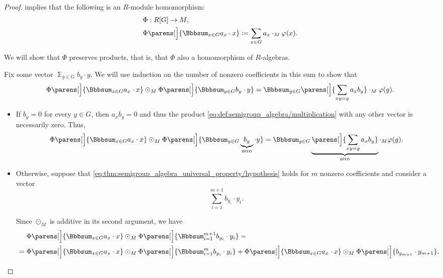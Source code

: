\begin{proof}
   implies that the following is an \( R \)-module homomorphism:
  \begin{equation*}
    \begin{aligned}
      &\Phi: R[G] \to M, \\
      &\Phi\parens[\Big]{ \Bbbsum_{x \in G} a_x \cdot x } \coloneqq \sum_{x \in G} a_x \cdot_M \varphi(x).
    \end{aligned}
  \end{equation*}

  We will show that \( \Phi \) preserves products, that is, that \( \Phi \) also a homomorphism of \( R \)-algebras.

  Fix some vector \( \Bbbsum_{y \in G} b_y \cdot y \). We will use induction on the number of nonzero coefficients in this sum to show that
  \begin{equation}\label{eq:thm:semigroup_algebra_universal_property/hypothesis}
    \Phi\parens[\Big]{ \Bbbsum_{x \in G} a_x \cdot x } \odot_M \Phi\parens[\Big]{ \Bbbsum_{y \in G} b_y \cdot y }
    =
    \Bbbsum_{g \in G} \parens[\Big]{ \sum_{x y = g} a_x b_y } \cdot_M \varphi(g).
  \end{equation}

  \begin{itemize}
    \item If \( b_y = 0 \) for every \( y \in G \), then \( a_x b_y = 0 \) and thus the product \eqref{eq:def:semigroup_algebra/multiplication} with any other vector is necessarily zero. Thus,
    \begin{equation*}
      \Phi\parens[\Big]{ \Bbbsum_{x \in G} a_x \cdot x } \odot_M \Phi\parens[\Big]{ \Bbbsum_{y \in G} \underbrace{b_y}_{\mathclap{\T*{zero}}} \cdot y }
      =
      \Bbbsum_{g \in G} \underbrace{\parens[\Big]{ \sum_{x y = g} a_x b_y }}_{\T{zero}} \cdot_M \varphi(g).
    \end{equation*}

    \item Otherwise, suppose that \eqref{eq:thm:semigroup_algebra_universal_property/hypothesis} holds for \( m \) nonzero coefficients and consider a vector
    \begin{equation*}
      \sum_{i=1}^{m+1} b_{y_i} \cdot y_i.
    \end{equation*}

    Since \( \odot_M \) is additive in its second argument, we have
    \begin{subequations}
      \begin{align}
        &\phantom{{}={}}
        \Phi\parens[\Big]{ \Bbbsum_{x \in G} a_x \cdot x } \odot_M \Phi\parens[\Big]{ \Bbbsum_{i=1}^{m+1} b_{y_i} \cdot y_i }
        = \nonumber \\ &=
        \Phi\parens[\Big]{ \Bbbsum_{x \in G} a_x \cdot x } \odot_M \Phi\parens[\Big]{ \Bbbsum_{i=1}^m b_{y_i} \cdot y_i } + \Phi\parens[\Big]{ \Bbbsum_{x \in G} a_x \cdot x } \odot_M \Phi\parens[\Big]{ b_{y_{m+1}} \cdot y_{m+1} }. \label{eq:thm:semigroup_algebra_universal_property/split}
      \end{align}
    \end{subequations}


\end{itemize}
\end{proof}
